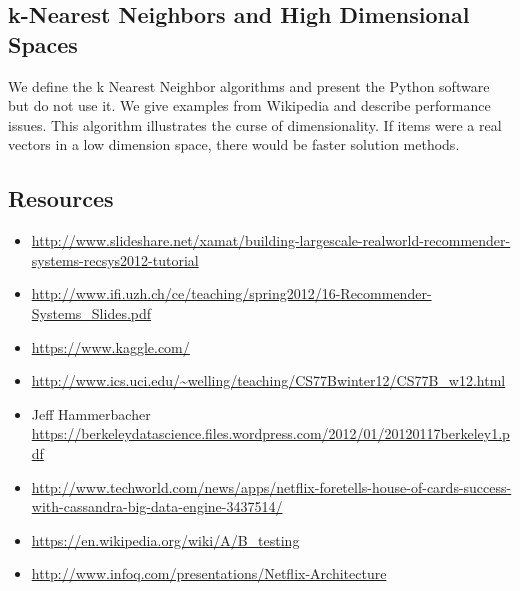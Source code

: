 


\subsection{k-Nearest Neighbors and High Dimensional Spaces}

We define the k Nearest Neighbor algorithms and present the Python
software but do not use it. We give examples from Wikipedia and describe
performance issues. This algorithm illustrates the curse of
dimensionality. If items were a real vectors in a low dimension space,
there would be faster solution methods.


\subsection{Resources}



\begin{itemize}

\item
  \url{http://www.slideshare.net/xamat/building-largescale-realworld-recommender-systems-recsys2012-tutorial}
\item
  \url{http://www.ifi.uzh.ch/ce/teaching/spring2012/16-Recommender-Systems_Slides.pdf}
\item
  \url{https://www.kaggle.com/}
\item
  \url{http://www.ics.uci.edu/~welling/teaching/CS77Bwinter12/CS77B_w12.html}
\item
  Jeff Hammerbacher
  \url{https://berkeleydatascience.files.wordpress.com/2012/01/20120117berkeley1.pdf}
\item
  \url{http://www.techworld.com/news/apps/netflix-foretells-house-of-cards-success-with-cassandra-big-data-engine-3437514/}
\item
  \url{https://en.wikipedia.org/wiki/A/B_testing}
\item
  \url{http://www.infoq.com/presentations/Netflix-Architecture}
\end{itemize}
